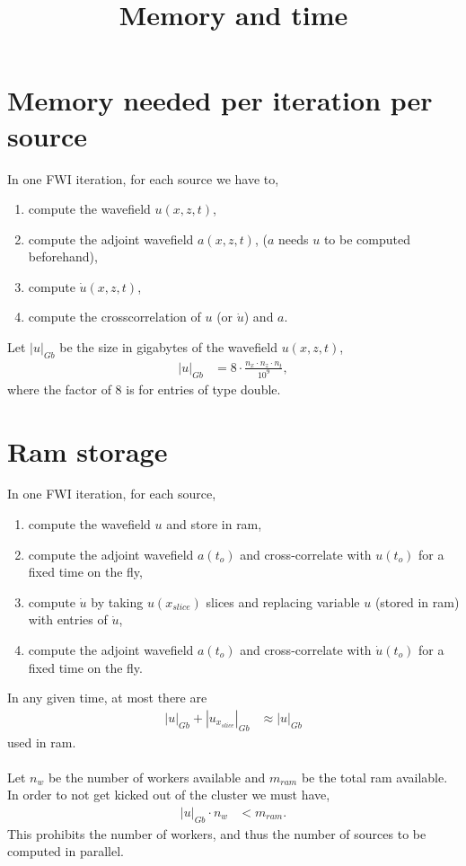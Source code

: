 \documentclass[a4paper,12pt]{article}
\title{Memory and time}
\author{}
\date{}
\begin{document}
 \maketitle
\section*{Memory needed per iteration per source}
In one FWI iteration, for each source we have to,
\begin{enumerate}
\item compute the wavefield $u(x,z,t)$,
\item compute the adjoint wavefield $a(x,z,t)$, ($a$ needs $u$ to be computed beforehand),
\item compute $\dot{u}(x,z,t)$,
\item compute the crosscorrelation of $u$ (or $\dot{u}$) and $a$.
\end{enumerate}
Let $|u|_{Gb}$ be the size in gigabytes of the wavefield $u(x,z,t)$, 
\begin{align*}
|u|_{Gb} &= 8\cdot\frac{n_x\cdot n_z\cdot n_t}{10^9},
\end{align*}
where the factor of 8 is for entries of type double.
\section*{Ram storage}
In one FWI iteration, for each source,
\begin{enumerate}
\item compute the wavefield $u$ and store in ram,
\item compute the adjoint wavefield $a(t_o)$ and cross-correlate with $u(t_o)$ for a fixed time on the fly,
\item compute $\dot{u}$ by taking $u(x_{slice})$ slices and replacing variable $u$ (stored in ram) with entries of $\dot{u}$,
\item compute the adjoint wavefield $a(t_o)$ and cross-correlate with $\dot{u}(t_o)$ for a fixed time on the fly.
\end{enumerate}
In any given time, at most there are 
\begin{align*}
|u|_{Gb}+|u_{x_{slice}}|_{Gb}&\approx |u|_{Gb}
\end{align*}
used in ram.
\\\\
Let $n_w$ be the number of workers available and $m_{ram}$ be the total ram available. In order to not get kicked out of the cluster we must have,
\begin{align*}
|u|_{Gb} \cdot n_w &< m_{ram}.
\end{align*}
This prohibits the number of workers, and thus the number of sources to be computed in parallel.
\end{document}
